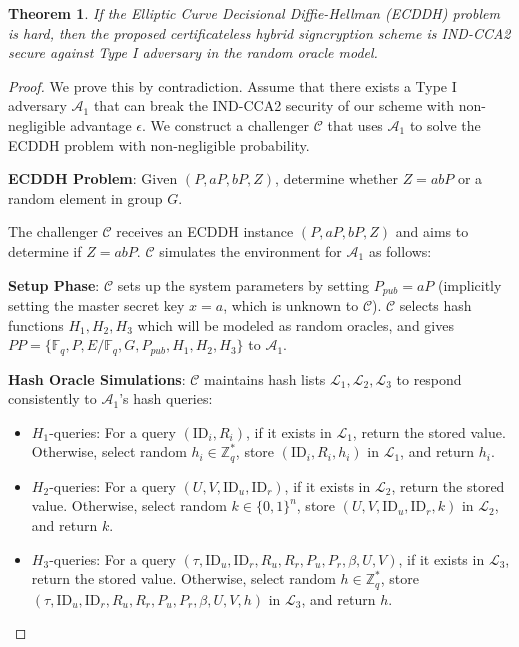 \documentclass[10pt]{article}
\newtheorem{theorem}{Theorem}
\newtheorem{proof}{Proof}
\begin{document}
\begin{theorem}
If the Elliptic Curve Decisional Diffie-Hellman (ECDDH) problem is hard, then the proposed certificateless hybrid signcryption scheme is IND-CCA2 secure against Type I adversary in the random oracle model.
\end{theorem}

\begin{proof}
We prove this by contradiction. Assume that there exists a Type I adversary $\mathcal{A}_1$ that can break the IND-CCA2 security of our scheme with non-negligible advantage $\epsilon$. We construct a challenger $\mathcal{C}$ that uses $\mathcal{A}_1$ to solve the ECDDH problem with non-negligible probability.

\textbf{ECDDH Problem}: Given $(P, aP, bP, Z)$, determine whether $Z = abP$ or a random element in group $G$.

The challenger $\mathcal{C}$ receives an ECDDH instance $(P, aP, bP, Z)$ and aims to determine if $Z = abP$. $\mathcal{C}$ simulates the environment for $\mathcal{A}_1$ as follows:

\textbf{Setup Phase}:
$\mathcal{C}$ sets up the system parameters by setting $P_{pub} = aP$ (implicitly setting the master secret key $x = a$, which is unknown to $\mathcal{C}$). $\mathcal{C}$ selects hash functions $H_1, H_2, H_3$ which will be modeled as random oracles, and gives $PP = \{\mathbb{F}_q, P, E/\mathbb{F}_q, G, P_{pub}, H_1, H_2, H_3\}$ to $\mathcal{A}_1$.

\textbf{Hash Oracle Simulations}:
$\mathcal{C}$ maintains hash lists $\mathcal{L}_1, \mathcal{L}_2, \mathcal{L}_3$ to respond consistently to $\mathcal{A}_1$'s hash queries:

\begin{itemize}
    \item $H_1$-queries: For a query $(\text{ID}_i, R_i)$, if it exists in $\mathcal{L}_1$, return the stored value. Otherwise, select random $h_i \in \mathbb{Z}_q^*$, store $(\text{ID}_i, R_i, h_i)$ in $\mathcal{L}_1$, and return $h_i$.
    
    \item $H_2$-queries: For a query $(U, V, \text{ID}_u, \text{ID}_r)$, if it exists in $\mathcal{L}_2$, return the stored value. Otherwise, select random $k \in \{0,1\}^n$, store $(U, V, \text{ID}_u, \text{ID}_r, k)$ in $\mathcal{L}_2$, and return $k$.
    
    \item $H_3$-queries: For a query $(\tau, \text{ID}_u, \text{ID}_r, R_u, R_r, P_u, P_r, \beta, U, V)$, if it exists in $\mathcal{L}_3$, return the stored value. Otherwise, select random $h \in \mathbb{Z}_q^*$, store $(\tau, \text{ID}_u, \text{ID}_r, R_u, R_r, P_u, P_r, \beta, U, V, h)$ in $\mathcal{L}_3$, and return $h$.
\end{itemize}


\end{proof}
\end{document}
